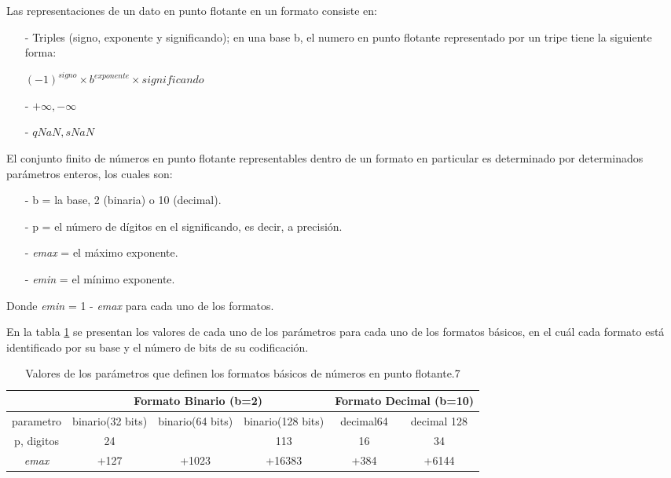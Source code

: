 Las representaciones de un dato en punto flotante en un formato consiste en:

\begin{itemize}
	\item[-]	Triples (signo, exponente y significando); en una base b, el numero en punto flotante representado por un tripe tiene la siguiente forma:\\
    \begin{center} $(-1)^{signo} \times b^{exponente} \times significando $ \end{center}
	\item[-]	$+\infty, -\infty $
	\item[-]	$qNaN, sNaN$
\end{itemize}

El conjunto finito de números en punto flotante representables dentro de un formato en particular es determinado por determinados parámetros enteros, los cuales son: \\

\begin{itemize}
	\item[-]		b = la base, 2 (binaria) o 10 (decimal).
	\item[-]		p = el número de dígitos en el significando, es decir, a precisión.
	\item[-]		\textit{emax} = el máximo exponente.
	\item[-]		\textit{emin} = el mínimo exponente.
\end{itemize}

Donde \textit{emin} = 1 - \textit{emax} para cada uno de los formatos.

En la tabla \ref{Tabla_Parametros}  se presentan los valores de cada uno de los parámetros para cada uno de los formatos básicos, en el cuál cada formato está identificado por su base y el número de bits de su codificación.\\

\begin{table}[H]
\centering
\caption{Valores de los parámetros que definen los formatos básicos de números en punto flotante.7}
\label{Tabla_Parametros}
\begin{tabular}{c|c|c|c|c|c|}
\cline{2-6}
                                    & \multicolumn{3}{c|}{Formato Binario (b=2)}              & \multicolumn{2}{c|}{Formato Decimal (b=10)} \\ \hline
\multicolumn{1}{|c|}{parametro}     & binario(32 bits) & binario(64 bits) & binario(128 bits) & decimal64           & decimal 128           \\ \hline
\multicolumn{1}{|c|}{p, digitos}    & 24               &                  & 113               & 16                  & 34                    \\ \hline
\multicolumn{1}{|c|}{\textit{emax}} & +127             & +1023            & +16383            & +384                & +6144                 \\ \hline
\end{tabular}
\end{table}

